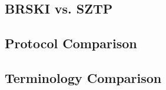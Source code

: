 \begin{landscape}
\chapter{BRSKI vs. SZTP}\label{appendix-A}
\section{Protocol Comparison}

\end{landscape}
\section{Terminology Comparison}
